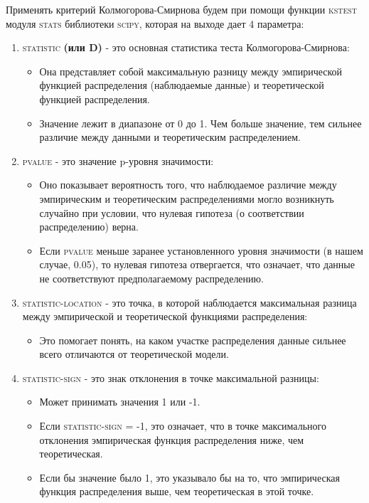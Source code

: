\documentclass[a4paper, 14pt]{extarticle}
\begin{document}
Применять критерий Колмогорова-Смирнова будем при помощи функции \textsc{kstest}
модуля \textsc{stats} библиотеки \textsc{scipy}, которая на выходе дает 4 
параметра:
\begin{enumerate}
    \item \textsc{statistic} \textbf{(или D)} - это основная статистика теста Колмогорова-Смирнова:
    \begin{itemize}
        \item Она представляет собой максимальную разницу между эмпирической 
        функцией распределения (наблюдаемые данные) и теоретической функцией 
        распределения.
        \item Значение лежит в диапазоне от 0 до 1. Чем больше значение, 
        тем сильнее различие между данными и теоретическим распределением.
    \end{itemize}

    \item \textsc{pvalue} - это значение p-уровня значимости:
    \begin{itemize}
        \item Оно показывает вероятность того, что наблюдаемое различие 
        между эмпирическим и теоретическим распределениями могло возникнуть 
        случайно при условии, что нулевая гипотеза (о соответствии распределению) 
        верна.
        \item Если \textsc{pvalue} меньше заранее установленного уровня 
        значимости (в нашем случае, 0.05), то нулевая гипотеза отвергается, 
        что означает, что данные не соответствуют предполагаемому распределению.
    \end{itemize}

    \item \textsc{statistic-location} - это точка, в которой наблюдается 
    максимальная разница между эмпирической и теоретической функциями 
    распределения:
    \begin{itemize}
        \item Это помогает понять, на каком участке распределения данные 
        сильнее всего отличаются от теоретической модели.
    \end{itemize}

    \item \textsc{statistic-sign} - это знак отклонения в точке максимальной 
    разницы:
    \begin{itemize}
        \item Может принимать значения 1 или -1.
        \item Если \textsc{statistic-sign} = -1, это означает, что в точке 
        максимального отклонения эмпирическая функция распределения 
        ниже, чем теоретическая.
        \item Если бы значение было 1, это указывало бы на то, 
        что эмпирическая функция распределения выше, чем теоретическая 
        в этой точке.
    \end{itemize}
\end{enumerate}
\end{document}
